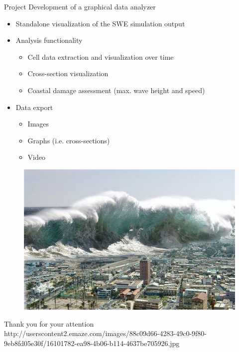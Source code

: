 \documentclass[shortpres,usenames,dvipsnames]{beamer}
\newcommand{\imgfullscale}{0.75}
\begin{document}
\begin{frame}{Project}
	Development of a graphical data analyzer
	\begin{itemize}
		\item Standalone visualization of the SWE simulation output
		\item Analysis functionality
		\begin{itemize}
			\item Cell data extraction and visualization over time
			\item Cross-section visualization
			\item Coastal damage assessment (max. wave height and speed)
		\end{itemize}
		\item Data export
		\begin{itemize}
			\item Images
			\item Graphs (i.e. cross-sections)
			\item Video
		\end{itemize}
	\end{itemize}
\end{frame}

\begin{frame}{}
	\begin{figure}
		\includegraphics[clip, width=\imgfullscale\linewidth]{img/tsunami.jpg}
	\end{figure}
	\centering
	Thank you for your attention
	\\
	\vfill
	\flushleft
	{\fontsize{5}{5} \selectfont http://userscontent2.emaze.com/images/88c09d66-4283-49c0-9f80-9eb8fd05e30f/16101782-ea98-4b06-b114-4637be705926.jpg}
\end{frame}
	
\end{document}
